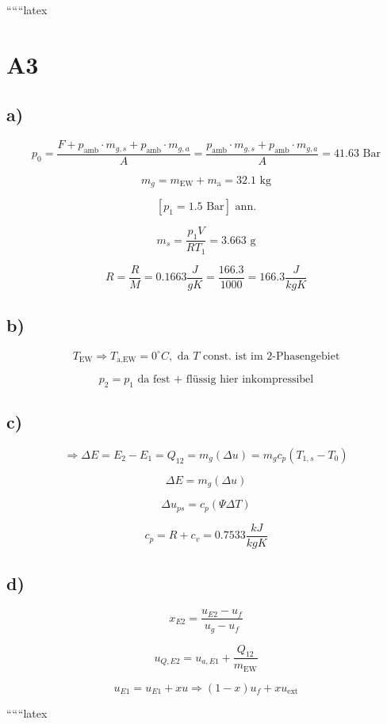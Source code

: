 
``````latex


\section*{A3}

\subsection*{a)}
\[
p_0 = \frac{F + p_{\text{amb}} \cdot m_{g,s} + p_{\text{amb}} \cdot m_{g,a}}{A} = \frac{p_{\text{amb}} \cdot m_{g,s} + p_{\text{amb}} \cdot m_{g,a}}{A} = 41.63 \text{ Bar}
\]

\[
m_g = m_{\text{EW}} + m_{\text{a}} = 32.1 \text{ kg}
\]

\[
[p_1 = 1.5 \text{ Bar}] \text{ ann.}
\]

\[
m_s = \frac{p_1 V}{R T_1} = 3.663 \text{ g}
\]

\[
R = \frac{R}{M} = 0.1663 \frac{J}{gK} = \frac{166.3}{1000} = 166.3 \frac{J}{kgK}
\]

\subsection*{b)}
\[
T_{\text{EW}} \Rightarrow T_{\text{a,EW}} = 0^\circ C, \text{ da } T \text{ const. ist im 2-Phasengebiet}
\]

\[
p_2 = p_1 \text{ da fest + flüssig hier inkompressibel}
\]

\subsection*{c)}
\[
\Rightarrow \Delta E = E_2 - E_1 = Q_{12} = m_g (\Delta u) = m_g c_p (T_{1,s} - T_{0})
\]

\[
\Delta E = m_g (\Delta u)
\]

\[
\Delta u_{ps} = c_p (\Psi \Delta T)
\]

\[
c_p = R + c_v = 0.7533 \frac{kJ}{kgK}
\]

\subsection*{d)}
\[
x_{E2} = \frac{u_{E2} - u_f}{u_g - u_f}
\]

\[
u_{Q,E2} = u_{a,E1} + \frac{Q_{12}}{m_{\text{EW}}}
\]

\[
u_{E1} = u_{E1} + x u \Rightarrow (1-x) u_f + x u_{\text{ext}}
\]

``````latex


